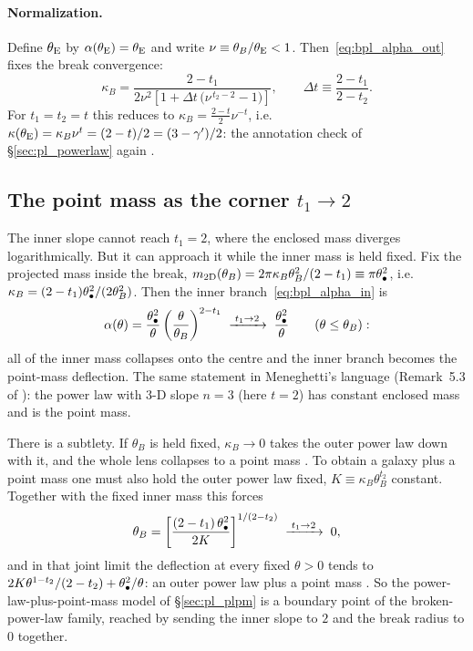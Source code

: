 \paragraph{Normalization.}
Define $\theta_{\mathrm{E}}$ by $\alpha(\theta_{\mathrm{E}})=\theta_{\mathrm{E}}$ and write
$\nu\equiv\theta_B/\theta_{\mathrm{E}}<1$.  Then~\eqref{eq:bpl_alpha_out} fixes the
break convergence:
\begin{equation}
    \kappa_B = \frac{2-t_1}{2\nu^{2}\left[1+\Delta t\,\big(\nu^{\,t_2-2}-1\big)\right]} ,
    \qquad
    \Delta t\equiv\frac{2-t_1}{2-t_2} .
    \label{eq:bpl_norm}
\end{equation}
For $t_1=t_2=t$ this reduces to $\kappa_B=\tfrac{2-t}{2}\nu^{-t}$,
i.e.\ $\kappa(\theta_{\mathrm{E}})=\kappa_B\nu^t=(2-t)/2=(3-\gamma')/2$: the
annotation check of \S\ref{sec:pl_powerlaw} again .

\subsection{The point mass as the corner $t_1\to2$}
\label{sec:bpl_pm_limit}

The inner slope cannot reach $t_1=2$, where the enclosed mass diverges
logarithmically.  But it can approach it while the inner mass is held
fixed.  Fix the projected mass inside the break,
$m_{2\rm D}(\theta_B)=2\pi\kappa_B\theta_B^2/(2-t_1)\equiv\pi\theta_{\bullet}^2$,
i.e.\ $\kappa_B=(2-t_1)\theta_{\bullet}^2/(2\theta_B^2)$.  Then the inner
branch~\eqref{eq:bpl_alpha_in} is
\begin{equation}
    \alpha(\theta)=\frac{\theta_{\bullet}^2}{\theta}\left(\frac{\theta}{\theta_B}\right)^{2-t_1}
    \;\xrightarrow{\;t_1\to2\;}\;\frac{\theta_{\bullet}^2}{\theta}
    \qquad(\theta\le\theta_B) :
    \label{eq:bpl_pm_corner}
\end{equation}
all of the inner mass collapses onto the centre and the inner branch
becomes the point-mass deflection.  The same statement in
Meneghetti's language (Remark~5.3 of
\citet{meneghetti_introduction_2021}): the power law with 3-D slope
$n=3$ (here $t=2$) has constant enclosed mass and is the point
mass.

There is a subtlety.  If $\theta_B$ is held fixed, $\kappa_B\to0$
takes the outer power law down with it, and the whole lens
collapses to a point mass .  To obtain a galaxy plus a
point mass one must also hold the outer power law fixed,
$K\equiv\kappa_B\theta_B^{t_2}$ constant.  Together with the fixed
inner mass this forces
\begin{equation}
    \theta_B=\left[\frac{(2-t_1)\,\theta_{\bullet}^2}{2K}\right]^{1/(2-t_2)}
    \;\xrightarrow{\;t_1\to2\;}\;0 ,
    \label{eq:bpl_joint_limit}
\end{equation}
and in that joint limit the deflection at every fixed $\theta>0$ tends
to $2K\theta^{1-t_2}/(2-t_2)+\theta_{\bullet}^2/\theta$: an outer power law
plus a point mass .  So the power-law-plus-point-mass
model of \S\ref{sec:pl_plpm} is a boundary point of the
broken-power-law family, reached by sending the inner slope to $2$ and
the break radius to $0$ together.

